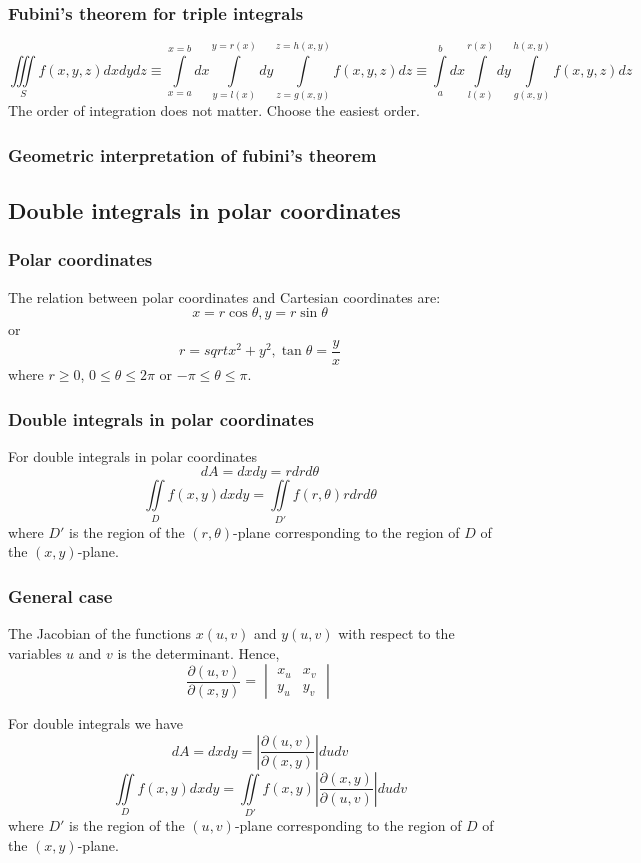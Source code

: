 \documentclass[12pt]{article}
\begin{document}
		\subsubsection{Fubini's theorem for triple integrals}
		\[
			\iiint\limits_S f(x,y,z) dxdydz \equiv \int\limits_{x=a}^{x=b} dx \int\limits_{y=l(x)}^{y=r(x)} dy \int\limits_{z=g(x,y)}^{z=h(x,y)} f(x,y,z) dz
											\equiv \int\limits_{a}^{b} dx \int\limits_{l(x)}^{r(x)} dy \int\limits_{g(x,y)}^{h(x,y)} f(x,y,z) dz
		\]
		The order of integration does not matter. Choose the easiest order.
		
		\subsubsection{Geometric interpretation of fubini's theorem}
	
	\subsection{Double integrals in polar coordinates}
		\subsubsection{Polar coordinates}
		The relation between polar coordinates and Cartesian coordinates are:
		\[
			x = r \cos{\theta}, y = r \sin{\theta}
		\]
		or
		\[
			r = sqrt{x^2 + y^2}, \tan{\theta} = \frac{y}{x}
		\]
		where $r \geq 0$, $0 \leq \theta \leq 2 \pi$ or $-\pi \le \theta \leq \pi$.
		
		\subsubsection{Double integrals in polar coordinates}
		For double integrals in polar coordinates
		\[
			dA = dxdy = rdrd \theta
		\]
		\[
			\iint\limits_D f(x,y) dxdy = \iint\limits_{D'} f(r,\theta) rdrd \theta
		\]
		where $D'$ is the region of the $(r,\theta)$-plane corresponding to the region of $D$ of the $(x,y)$-plane.
		
		\subsubsection{General case}
		\begin{defn}
			The Jacobian of the functions $x(u,v)$ and $y(u,v)$ with respect to the variables $u$ and $v$ is the determinant. Hence,
			\[
				\frac{\partial (u,v)}{\partial (x,y)} = 
				\begin{vmatrix}
					x_u & x_v  \\
					y_u & y_v 
				\end{vmatrix} 
			\]
		\end{defn}
		For double integrals we have
		\[
			dA = dxdy = \left| \frac{\partial (u,v)}{\partial (x,y)} \right| dudv
		\]
		\[
			\iint\limits_D f(x,y) dxdy = \iint\limits_{D'} f(x,y) | \frac{\partial (x,y)}{\partial (u,v)} | dudv
		\]
		where $D'$ is the region of the $(u,v)$-plane corresponding to the region of $D$ of the $(x,y)$-plane.
	
\end{document}
